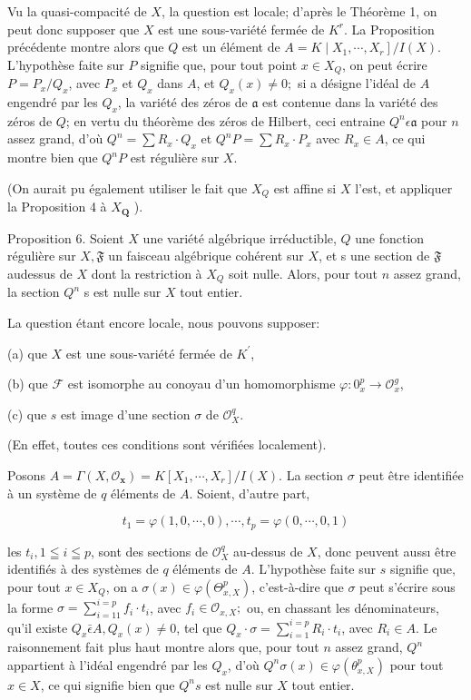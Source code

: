 Vu la quasi-compacité de $X$, la question est locale; d'après le Théorème 1, on peut donc supposer que $X$ est une sous-variété fermée de $K^{r}$. La Proposition précédente montre alors que $Q$ est un élément de $\left.A=K \mid X_{1}, \cdots, X_{r}\right] / I(X)$. L'hypothèse faite sur $P$ signifie que, pour tout point $x \in X_{Q}$, on peut écrire $P=P_{x} / Q_{x}$, avec $P_{x}$ et $Q_{x}$ dans $A$, et $Q_{x}(x) \neq 0 ;$ si a désigne l'idéal de $A$ engendré par les $Q_{x}$, la variété des zéros de $\mathfrak{a}$ est contenue dans la variété des zéros de $Q$; en vertu du théorème des zéros de Hilbert, ceci entraine $Q^{n} \epsilon \mathfrak{a}$ pour $n$ assez grand, d'où $Q^{n}=\sum R_{x} \cdot Q_{x}$ et $Q^{n} P=\sum R_{x} \cdot P_{x}$ avec $R_{x} \in A$, ce qui montre bien que $Q^{n} P$ est régulière sur $X$.

(On aurait pu également utiliser le fait que $X_{Q}$ est affine si $X$ l'est, et appliquer la Proposition 4 à $X_{\mathbf{Q}}$ ).

Proposition 6. Soient $X$ une variété algébrique irréductible, $Q$ une fonction régulière sur $X, \mathfrak{F}$ un faisceau algébrique cohérent sur $X$, et s une section de $\mathfrak{F}$ audessus de $X$ dont la restriction à $X_{Q}$ soit nulle. Alors, pour tout $n$ assez grand, la section $Q^{n}$ s est nulle sur $X$ tout entier.

La question étant encore locale, nous pouvons supposer:

(a) que $X$ est une sous-variété fermée de $K^{\prime}$,

(b) que $\mathcal{F}$ est isomorphe au conoyau d'un homomorphisme $\varphi: 0_{x}^{p} \rightarrow \mathcal{O}_{x}^{g}$,

(c) que $s$ est image d'une section $\sigma$ de $\mathcal{O}_{X}^{q}$.

(En effet, toutes ces conditions sont vérifiées localement).

Posons $A=\Gamma\left(X, \mathcal{O}_{\boldsymbol{x}}\right)=K\left[X_{1}, \cdots, X_{r}\right] / I(X) .$ La section $\sigma$ peut être identifiée à un système de $q$ éléments de $A .$ Soient, d'autre part,

$$
t_{1}=\varphi(1,0, \cdots, 0), \cdots, t_{p}=\varphi(0, \cdots, 0,1)
$$

les $t_{i}, 1 \leqq i \leqq p$, sont des sections de $\mathcal{O}_{X}^{q}$ au-dessus de $X$, donc peuvent aussı être identifiés à des systèmes de $q$ éléments de $A$. L'hypothèse faite sur $s$ signifie que, pour tout $x \in X_{Q}$, on a $\sigma(x) \in \varphi\left(\Theta_{x, X}^{p}\right)$, c'est-à-dire que $\sigma$ peut s'écrire sous la forme $\sigma=\sum_{i=11}^{i=p} f_{i} \cdot t_{i}$, avec $f_{i} \in \mathcal{O}_{x, X} ;$ ou, en chassant les dénominateurs, qu'il existe $Q_{x} \bar{\epsilon} A, Q_{x}(x) \neq 0$, tel que $Q_{x} \cdot \sigma=\sum_{i=1}^{i=p} R_{i} \cdot t_{i}$, avec $R_{i} \in A$. Le raisonnement fait plus haut montre alors que, pour tout $n$ assez grand, $Q^{n}$ appartient à l'idéal engendré par les $Q_{x}$, d'où $Q^{n} \sigma(x) \in \varphi\left(\theta_{x, X}^{p}\right)$ pour tout $x \in X$, ce qui signifie bien que $Q^{n} s$ est nulle sur $X$ tout entier.

